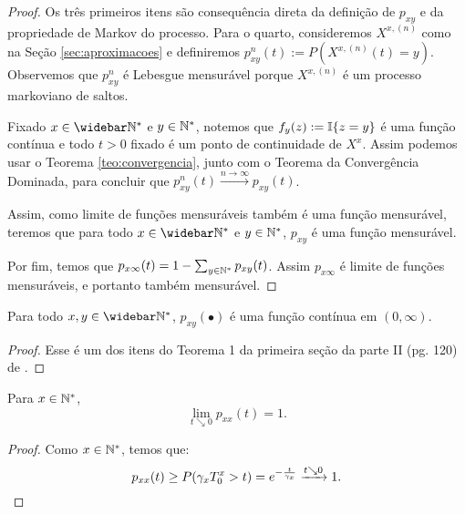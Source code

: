 \begin{proof}
  Os três primeiros itens são consequência direta da definição de
  $p_{x y}$ e da propriedade de Markov do processo. Para o quarto,
  consideremos $X^{x, (n)}$ como na Seção \ref{sec:aproximacoes} e
  definiremos $p^n_{x y}(t) := P(X^{x, (n)}(t) = y)$. Observemos que
  $p^n_{xy}$ é Lebesgue mensurável porque $X^{x, (n)}$ é um processo
  markoviano de saltos.

  Fixado $x \in \Nzb$ e $y \in {\mathbb{N^*}}$, notemos que $f_y(z) := {\mathbb{I}}\{ z =
  y \}$ é uma função contínua e todo $t > 0$ fixado é \qc um ponto de
  continuidade de $X^x$. Assim podemos usar o Teorema
  \ref{teo:convergencia}, junto com o Teorema da Convergência
  Dominada, para concluir que $p_{x y}^n(t) \xrightarrow{n\to\infty}
  p_{x y}(t)$.

  Assim, como limite de funções mensuráveis também é uma função
  mensurável, teremos que para todo $x \in \Nzb$ e $y \in {\mathbb{N^*}}$, $p_{x
    y}$ é uma função mensurável.

  Por fim, temos que $p_{x \infty} (t) = 1 - \sum_{y \in {\mathbb{N^*}}} p_{x y}
  (t)$. Assim $p_{x \infty}$ é limite de funções mensuráveis, e
  portanto também mensurável.
\end{proof}

\begin{proposicao}
  \label{prop:transicao-continua}
  Para todo $x, y \in \Nzb$, $p_{x y}(\bullet)$ é uma função contínua
  em $(0, \infty)$.
\end{proposicao} 

\begin{proof}
  Esse é um dos itens do Teorema 1 da primeira seção da parte II
  (pg. 120) de \cite{chung:67}.
\end{proof}

\begin{proposicao}
  \label{prop:continuidade-facil}
  Para $x \in {\mathbb{N^*}}$,
  \begin{equation}
    \lim_{t \searrow 0}p_{xx}(t) = 1.   
  \end{equation}
\end{proposicao}
\begin{proof}
  Como $x \in {\mathbb{N^*}}$, temos que:
  \begin{displaymath}
    p_{xx}(t) \geq P( \gamma_x T^x_0 > t) = e^{-\frac{t}{\gamma_x}}
    \xrightarrow{t \searrow 0} 1.
    \qedhere
  \end{displaymath}
\end{proof}


